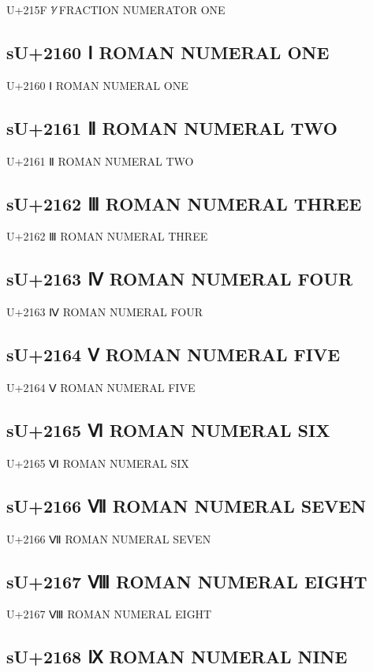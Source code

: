 U+215F ⅟ FRACTION NUMERATOR ONE

\subsection{sU+2160 Ⅰ ROMAN NUMERAL ONE}

U+2160 Ⅰ ROMAN NUMERAL ONE

\subsection{sU+2161 Ⅱ ROMAN NUMERAL TWO}

U+2161 Ⅱ ROMAN NUMERAL TWO

\subsection{sU+2162 Ⅲ ROMAN NUMERAL THREE}

U+2162 Ⅲ ROMAN NUMERAL THREE

\subsection{sU+2163 Ⅳ ROMAN NUMERAL FOUR}

U+2163 Ⅳ ROMAN NUMERAL FOUR

\subsection{sU+2164 Ⅴ ROMAN NUMERAL FIVE}

U+2164 Ⅴ ROMAN NUMERAL FIVE

\subsection{sU+2165 Ⅵ ROMAN NUMERAL SIX}

U+2165 Ⅵ ROMAN NUMERAL SIX

\subsection{sU+2166 Ⅶ ROMAN NUMERAL SEVEN}

U+2166 Ⅶ ROMAN NUMERAL SEVEN

\subsection{sU+2167 Ⅷ ROMAN NUMERAL EIGHT}

U+2167 Ⅷ ROMAN NUMERAL EIGHT

\subsection{sU+2168 Ⅸ ROMAN NUMERAL NINE}

